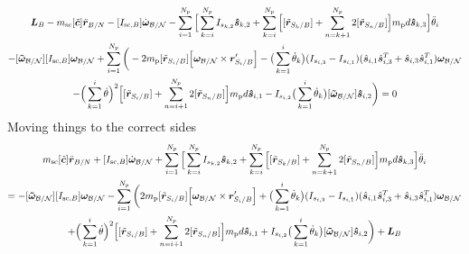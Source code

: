 \begin{multline}
	\bm L_B - m_{\text{sc}}[\tilde{\bm{c}}]\ddot{\bm r}_{B/N} -[I_{\text{sc},B}] \dot{\bm\omega}_{\cal B/N} - \sum\limits_{i=1}^{N_p} \Big[\sum^{N_p}_{k=i}I_{s_{k,2}} \bm{\hat{s}}_{k,2} + \sum\limits_{k=i}^{N_p}\Big[ [\tilde{{\bm r}}_{S_{k}/B}] + \sum\limits_{n=k+1}^{N_p}2[\tilde{{\bm r}}_{S_{n}/B}]\Big]m_{\text{p}} d \bm{\hat{s}}_{k,3} \Big] \ddot{\theta}_i \\
	-[\bm{\tilde{\omega}}_{\cal B/N}] [I_{\text{sc},B}] \bm\omega_{\cal B/N} 
	+ \sum\limits_{i=1}^{N_p}\bigg(- 2 m_{\text{p}} [\tilde{{\bm r}}_{S_{i}/B}] \Big[\bm\omega_{\cal B/N} \times \bm{r}'_{S_i/B}\Big] -\big(\sum^{i}_{k=1}\dot{\theta}_k\big)(I_{s_{i,3}}-I_{s_{i,1}})(\hat{\bm s}_{i,1}\hat{\bm s}_{i,3}^{T}+\hat{\bm s}_{i,3}\hat{\bm s}_{i,1}^{T}) \bm\omega_{\cal B/N} \\ 
	- \Big( \sum\limits_{k=1}^{i} \dot{\theta}\Big)^2 \Big[[\tilde{{\bm r}}_{S_{i}/B}] + \sum\limits_{n=i+1}^{N_p}2[\tilde{{\bm r}}_{S_{n}/B}]\Big] m_{\text{p}} d \bm{\hat{s}}_{i,1}
	- I_{s_{i,2}} \big(\sum^{i}_{k=1}\dot{\theta}_k\big) [\bm{\tilde{\omega}}_{\cal B/N}] \bm{\hat{s}}_{i,2} \bigg) = 0
\end{multline}
Moving things to the correct sides
\begin{multline}
	m_{\text{sc}}[\tilde{\bm{c}}]\ddot{\bm r}_{B/N} + [I_{\text{sc},B}] \dot{\bm\omega}_{\cal B/N} + \sum\limits_{i=1}^{N_p} \Big[\sum^{N_p}_{k=i}I_{s_{k,2}} \bm{\hat{s}}_{k,2} + \sum\limits_{k=i}^{N_p}\Big[ [\tilde{{\bm r}}_{S_{k}/B}] + \sum\limits_{n=k+1}^{N_p}2[\tilde{{\bm r}}_{S_{n}/B}]\Big]m_{\text{p}} d \bm{\hat{s}}_{k,3} \Big] \ddot{\theta}_i \\
	= -[\bm{\tilde{\omega}}_{\cal B/N}] [I_{\text{sc},B}] \bm\omega_{\cal B/N} - \sum\limits_{i=1}^{N_p}\bigg(2 m_{\text{p}} [\tilde{{\bm r}}_{S_{i}/B}] \Big[\bm\omega_{\cal B/N} \times \bm{r}'_{S_i/B}\Big] + \big(\sum^{i}_{k=1}\dot{\theta}_k\big)(I_{s_{i,3}}-I_{s_{i,1}})(\hat{\bm s}_{i,1}\hat{\bm s}_{i,3}^{T}+\hat{\bm s}_{i,3}\hat{\bm s}_{i,1}^{T}) \bm\omega_{\cal B/N} \\ 
	+ \Big( \sum\limits_{k=1}^{i} \dot{\theta}\Big)^2 \Big[[\tilde{{\bm r}}_{S_{i}/B}] + \sum\limits_{n=i+1}^{N_p}2[\tilde{{\bm r}}_{S_{n}/B}]\Big] m_{\text{p}} d \bm{\hat{s}}_{i,1}
	+ I_{s_{i,2}} \big(\sum^{i}_{k=1}\dot{\theta}_k\big) [\bm{\tilde{\omega}}_{\cal B/N}] \bm{\hat{s}}_{i,2} \bigg) + \bm L_B
\end{multline}

